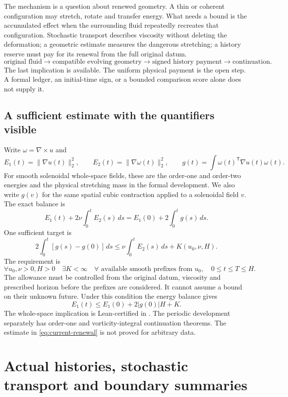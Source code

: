 \documentclass[11pt]{article}
\theoremstyle{definition}
\begin{document}
The mechanism is a question about renewed geometry. A thin or coherent
configuration may stretch, rotate and transfer energy. What needs a bound is
the accumulated effect when the surrounding fluid repeatedly recreates that
configuration. Stochastic transport describes viscosity without deleting the
deformation; a geometric estimate measures the dangerous stretching; a
history reserve must pay for its renewal from the full original datum.
\[
 \text{original fluid}
 \longrightarrow \text{compatible evolving geometry}
 \longrightarrow \text{signed history payment}
 \longrightarrow \text{continuation}.
\]
The last implication is available. The uniform physical payment is the open
step. A formal ledger, an initial-time sign, or a bounded comparison score
alone does not supply it.

\subsection{A sufficient estimate with the quantifiers visible}

Write $\omega=\nabla\times u$ and
\[
 E_1(t)=\|\nabla u(t)\|_2^2,\qquad
 E_2(t)=\|\nabla\omega(t)\|_2^2,\qquad
 g(t)=\int\omega(t)^\mathsf T\nabla u(t)\omega(t).
\]
For smooth solenoidal whole-space fields, these are the order-one and
order-two energies and the physical stretching mass in the formal
development. We also write $g(v)$ for the same spatial cubic contraction
applied to a solenoidal field $v$. The exact balance is
\[
 E_1(t)+2\nu\int_0^t E_2(s)\,ds
 =E_1(0)+2\int_0^t g(s)\,ds.
\]
One sufficient target is
\begin{equation}\label{eq:current-renewal}
 2\int_0^t [g(s)-g(0)]\,ds
 \le \nu\int_0^t E_2(s)\,ds+K(u_0,\nu,H).
\end{equation}
The requirement is
\[
 \forall u_0,\nu>0,H>0\quad
 \exists K<\infty\quad
 \forall\text{ available smooth prefixes from }u_0,
 \quad 0\le t\le T\le H.
\]
The allowance must be controlled from the original datum, viscosity and
prescribed horizon before the prefixes are considered. It cannot assume a
bound on their unknown future. Under this condition the energy balance gives
\[
 E_1(t)\le E_1(0)+2|g(0)|H+K.
\]
The whole-space implication is Lean-certified in
.
The periodic development separately has order-one and vorticity-integral
continuation theorems. The estimate in
\eqref{eq:current-renewal} is not proved for arbitrary data.

\section{Actual histories, stochastic transport and boundary summaries}
\label{sec:current-histories}
\end{document}
